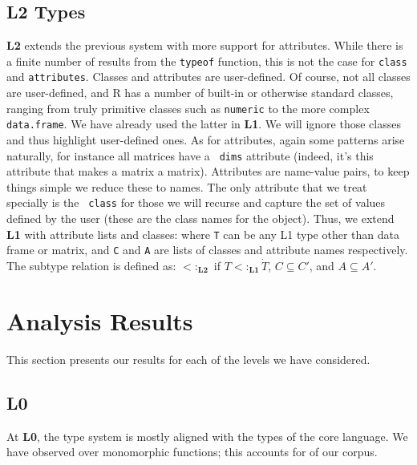 \documentclass[acmsmall,10pt,review,anonymous]{acmart}\settopmatter{printfolios=true,printccs=false,printacmref=false}
\newcommand{\code}[1]{\lstinline|#1|\xspace}
\begin{document}
\subsection{L2 Types}
\label{sec:L2def}

{\bf L2} extends the previous system with more support for attributes.
While there is a finite number of results from the {\tt typeof} function,
this is not the case for \code{class} and \code{attributes}.  Classes and
attributes are user-defined.  Of course, not all classes are user-defined,
and R has a number of built-in or otherwise standard classes, ranging from
truly primitive classes such as {\tt numeric} to the more complex {\tt
  data.frame}.  We have already used the latter in {\bf L1}. We will ignore
those classes and thus highlight user-defined ones.  As for attributes,
again some patterns arise naturally, for instance all matrices have a {\tt
  dims} attribute (indeed, it's this attribute that makes a matrix a
matrix).  Attributes are name-value pairs, to keep things simple we reduce
these to names. The only attribute that we treat specially is the {\tt
  class} for those we will recurse and capture the set of values defined by
the user (these are the class names for the object).  Thus, we extend {\bf
  L1} with attribute lists and classes:  where {\tt T}
can be any L1 type other than data frame or matrix, and {\tt C} and {\tt A}
are lists of classes and attribute names respectively.  The subtype relation is defined as:
 $<:_{\mathbf{L2}}$ \xspace {} if 
$ T <:_{\mathbf{L1}} \dot T$, $C \subseteq C'$, and $A \subseteq A'$.


%
%
%
%
%
%
\section{Analysis Results}\label{sec:results}

This section presents our results for each of the levels we have considered.

\subsection{L0}

At {\bf L0}, the type system is mostly aligned with the types of the core language.  We
have observed over  monomorphic functions; this accounts for  of our
corpus. 
\end{document}
